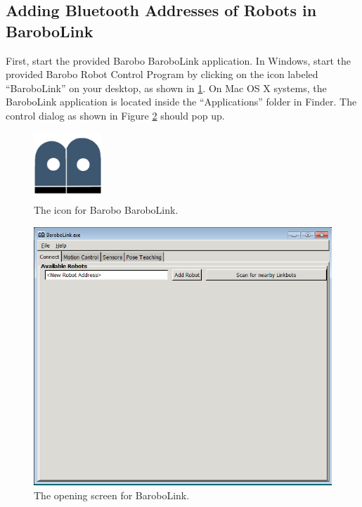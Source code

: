\documentclass{article}
\begin{document}
\subsection{\label{sec:pairing_robotcontroller} Adding Bluetooth Addresses of Robots in BaroboLink}
First, start the provided Barobo BaroboLink application.
In Windows, start the provided Barobo Robot Control Program by clicking on the icon labeled 
``BaroboLink'' on your desktop, as shown in \ref{fig:barobo_icon.png}. On Mac OS X systems,
the BaroboLink application is located inside the ``Applications'' folder in Finder. The 
control dialog as shown in Figure \ref{fig:shot1.png} should pop up.
\begin{figure}[H]
\begin{center}
\includegraphics[width=1in]{images/barobo_icon.png}
\end{center}
\caption{\label{fig:barobo_icon.png} The icon for Barobo BaroboLink.}
\end{figure}

\begin{figure}[H]
\begin{center}
\includegraphics[width=4.5in]{images/robomancer_screenshot1.png}
\end{center}
\caption{\label{fig:shot1.png} The opening screen for BaroboLink.}
\end{figure}
\end{document}
